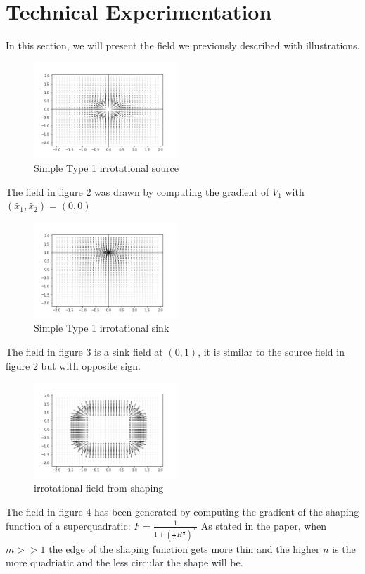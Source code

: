 \section{Technical Experimentation}
In this section, we will present the field we previously described with illustrations. 
\begin{figure}[h!]
    \centering
    \includegraphics[width=0.48\textwidth]{Images/simplesource.png}
    \caption{Simple Type 1 irrotational source}
    \label{fig:simplesource}
\end{figure}
The field in figure 2 was drawn by computing the gradient of $V_1$ with $(\tilde{{x}_{1}}, \tilde{{x}_{2}}) = (0,0)$ 

\begin{figure}[h!]
    \centering
    \includegraphics[width=0.48\textwidth]{Images/simplesink01.png}
    \caption{Simple Type 1 irrotational sink}
    \label{fig:simplesink}
\end{figure}
The field in figure 3 is a sink field at $(0,1)$, it is similar to the source field in figure 2 but with opposite sign.

\begin{figure}[h!]
    \centering
    \includegraphics[width=0.48\textwidth]{Images/irrotafromshaping.png}
    \caption{irrotational field from shaping}
    \label{fig:irrotafromshaping}
\end{figure}
The field in figure 4 has been generated by computing the gradient of the shaping function of a superquadratic: 
$F=\frac{1}{1+(\frac{1}{L}H^{\frac{1}{n}})^m}$
As stated in the paper, when $m>>1$ the edge of the shaping function gets more thin and the higher $n$ is the more quadriatic and the less circular the shape will be.

